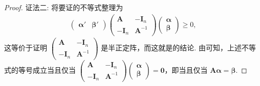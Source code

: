 \documentclass[../../main.tex]{subfiles}
\begin{document}
\begin{proof}
{\color{blue}证法二:}
将要证的不等式整理为
\begin{align*}
\begin{pmatrix}
\boldsymbol{\alpha}' & \boldsymbol{\beta}'
\end{pmatrix}
\begin{pmatrix}
\boldsymbol{A} & -\boldsymbol{I}_n \\
-\boldsymbol{I}_n & \boldsymbol{A}^{-1}
\end{pmatrix}
\begin{pmatrix}
\boldsymbol{\alpha} \\
\boldsymbol{\beta}
\end{pmatrix} \geq 0,
\end{align*}
这等价于证明 $\begin{pmatrix}
\boldsymbol{A} & -\boldsymbol{I}_n \\
-\boldsymbol{I}_n & \boldsymbol{A}^{-1}
\end{pmatrix}$ 是半正定阵，而这就是的结论. 由可知，上述不等式的等号成立当且仅当 $\begin{pmatrix}
\boldsymbol{A} & -\boldsymbol{I}_n \\
-\boldsymbol{I}_n & \boldsymbol{A}^{-1}
\end{pmatrix}
\begin{pmatrix}
\boldsymbol{\alpha} \\
\boldsymbol{\beta}
\end{pmatrix}=\boldsymbol{0}$，即当且仅当 $\boldsymbol{A}\boldsymbol{\alpha}=\boldsymbol{\beta}$.
\end{proof}
\end{document}
